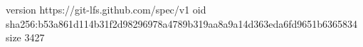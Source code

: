 version https://git-lfs.github.com/spec/v1
oid sha256:b53a861d114b31f2d98296978a4789b319aa8a9a14d363eda6fd9651b6365834
size 3427
